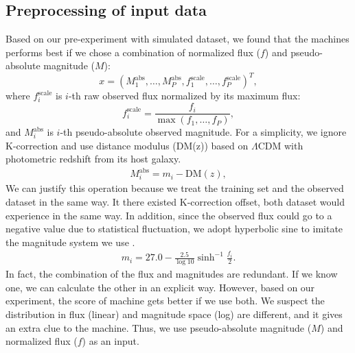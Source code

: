 \documentclass[useamsfonts]{pasj01}
\begin{document}
\subsection{Preprocessing of input data}
\label{sec:preproc}
Based on our pre-experiment with simulated dataset, we found that the machines performs best if we 
chose a combination of normalized flux ($f$) and pseudo-absolute magnitude ($M$):
\begin{equation}
    x = \left( M_1^\mathrm{abs}, \ldots, M_P^\mathrm{abs}, f_{1}^{\mathrm{scale}}, \ldots, f_{P}^{\mathrm{scale}} \right)^T,
\end{equation}
where $f_{i}^{\mathrm{scale}}$ is $i$-th raw observed flux normalized by its maximum flux:
\begin{equation}
    f_{i}^{\mathrm{scale}} = \frac{f_i}{\max \left(f_1, \ldots, f_P \right)},    \label{eq:scaled_flux}
\end{equation}
and $M_i^\mathrm{abs}$ is $i$-th pseudo-absolute observed magnitude.
For a simplicity, we ignore K-correction and use distance modulus (DM(z)) based on $\Lambda$CDM with photometric redshift
from its host galaxy.
\begin{eqnarray}
    M_i^\mathrm{abs} = m_i - \mathrm{DM}\left(z\right),
\end{eqnarray}
We can justify this operation because we treat the training set and the observed dataset in the same way.
It there existed K-correction offset, both dataset would experience in the same way.
In addition, since the observed flux could go to a negative value due to statistical fluctuation, 
we adopt hyperbolic sine to imitate the magnitude system we use \citep{lupton99a}.  
\begin{eqnarray}
    m_i = 27.0 - \frac{2.5}{\log 10} \sinh^{-1} \frac{f_i}{2}. \label{eq:mag} 
\end{eqnarray}
In fact, the combination of the flux and magnitudes are redundant.   If we know one, we can calculate the other
in an explicit way.   
However, based on our experiment, the score of machine gets better if we use both.  
We suspect the distribution in flux (linear) and magnitude space (log) are different, 
and it gives an extra clue to the machine.
Thus, we use pseudo-absolute magnitude ($M$) and normalized flux ($f$) as an input.
\end{document}
